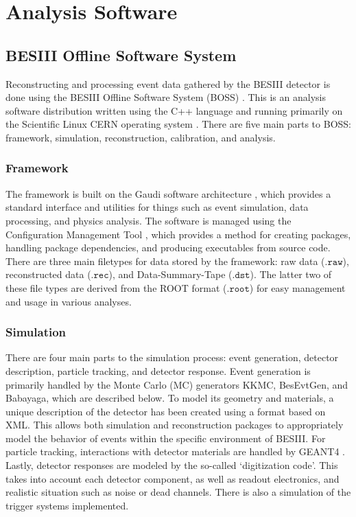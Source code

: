 \chapter{Analysis Software}
\label{ch:software}

\section{BESIII Offline Software System}

Reconstructing and processing event data gathered by the BESIII detector is done using the BESIII Offline Software System (BOSS) \cite{ref:Li:2006}.
This is an analysis software distribution written using the C++ language and running primarily on the Scientific Linux CERN operating system \cite{ref:SLC5}.
There are five main parts to BOSS: framework, simulation, reconstruction, calibration, and analysis.


\subsection{Framework}

The framework is built on the Gaudi software architecture \cite{ref:Barrand:2001}, which provides a standard interface and utilities for things such as event simulation, data processing, and physics analysis.
The software is managed using the Configuration Management Tool \cite{ref:Arnault:2000}, which provides a method for creating packages, handling package dependencies, and producing executables from source code.
There are three main filetypes for data stored by the framework: raw data ($\texttt{.raw}$), reconstructed data ($\texttt{.rec}$), and Data-Summary-Tape ($\texttt{.dst}$).
The latter two of these file types are derived from the ROOT \cite{ref:ROOT} format ($\texttt{.root}$) for easy management and usage in various analyses.


\subsection{Simulation}

There are four main parts to the simulation process: event generation, detector description, particle tracking, and detector response.
Event generation is primarily handled by the Monte Carlo (MC) generators KKMC, BesEvtGen, and Babayaga, which are described below.
To model its geometry and materials, a unique description of the detector has been created using a format based on XML.
This allows both simulation and reconstruction packages to appropriately model the behavior of events within the specific environment of BESIII.
For particle tracking, interactions with detector materials are handled by GEANT4 \cite{ref:Agostinelli:2003}.
Lastly, detector responses are modeled by the so-called `digitization code'.
This takes into account each detector component, as well as readout electronics, and realistic situation such as noise or dead channels.
There is also a simulation of the trigger systems implemented.


